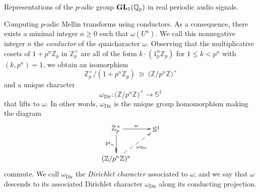 \documentclass[letterpaper,11pt, reqno]{amsart}
\newtheorem{monodromy theorem}{Monodromy Theorem}[subsection]
\newtheorem{wild conjecture}[theorem]{Wild Conjecture}
\newtheorem{research objectives}{Research objectives}[subsection]
\newtheorem{research question}[theorem]{Research questions}
\newtheorem{aside question}[theorem]{Aside question}
\newtheorem{audio example}[theorem]{\loudspeaker[3] Example}
\newtheorem{blank remark}[theorem]{}
\newtheorem{terminology and comment}[theorem]{Terminology and comment}
\newtheorem{purity hypothesis}[theorem]{Purity hypothesis}
\newtheorem{corollary of the purity hypothesis}[theorem]{Corollary of the purity hypothesis}
\newcommand{\ZZ} {{\mathbb Z}}
\newcommand{\lra}{{\longrightarrow}}
\numberwithin{equation}{theorem}
\begin{document}
\begin{section}{Representations of the $p$-adic group $\bold{GL}_{1}(\mathbb{Q}_{p})$
in real periodic audio signals.}
\begin{subsection}{Computing $p$-adic Mellin transforms using conductors.}
As a consequence, there exists a minimal integer $n\ge 0$ such that $\omega(U^n)$. We call this nonnegative integer $n$ the {\em conductor} of the quaicharacter $\omega$. Observing that the multiplicative cosets of $1+p^n\ZZ_p$ in $\ZZ^\times_p$ are all of the form $k\cdot(1_p^n\ZZ_p)$ for $1\le k<p^n$ with $(k,p^n)=1$, we obtain an isomorphism
	$$
	\ZZ^\times_p\big/(1\!+\!p^n\ZZ_p)
	\ \cong\ 
	\big(\ZZ/p^n\ZZ\big)^{\!\times}
	$$
and a unique character
	$$
	\omega_\text{Dir}:\big(\ZZ/p^n\ZZ\big)^{\!\times}\lra\mathbb{S}^1
	$$
that lifts to $\omega$. In other words, $\omega_{\text{Dir}}$ is the unique group homomorphism making the diagram
	$$
	\begin{xy}
	(0,0)*+{\ZZ^\times_p}="1";
	(20,0)*+{\mathbb{S}^1}="2";
	(0,-15)*+{(\ZZ/p^n\ZZ)^{\!\times}}="3";
	{\ar@{->>}_{\text{pr}_n} "1"; "3"};
	{\ar@{->}^{\omega} "1"; "2"};
	{\ar@{-->}_{\omega_{\text{Dir}}} "3"; "2"};
	\end{xy}
	$$
commute. We call $\omega_\text{Dir}$ the {\em Dirichlet character} associated to $\omega$, and we say that $\omega$ descends to its associated Dirichlet character $\omega_{\text{Dir}}$ along its conducting projection.


\end{subsection}
\end{section}
\end{document}
